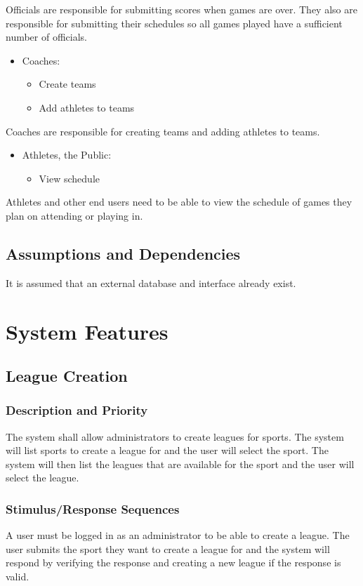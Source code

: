 \documentclass{scrreprt}
\begin{document}
Officials are responsible for submitting scores when games are over. They also are responsible for submitting their schedules so all games played have a sufficient number of officials.
\begin{itemize}
    \item Coaches:
    \begin{itemize}
        \item Create teams
        \item Add athletes to teams
    \end{itemize}
\end{itemize}
Coaches are responsible for creating teams and adding athletes to teams.
\begin{itemize}
    \item Athletes, the Public:
    \begin{itemize}
        \item View schedule
    \end{itemize}
\end{itemize}
Athletes and other end users need to be able to view the schedule of games they plan on attending or playing in.

\section{Assumptions and Dependencies}

It is assumed that an external database and interface already exist.

\chapter{System Features}

\section{League Creation}

\subsection{Description and Priority}
The system shall allow administrators to create leagues for sports. The system will list sports to create a league for and the user will select the sport. The system will then list the leagues that are available for the sport and the user will select the league.

\subsection{Stimulus/Response Sequences}
A user must be logged in as an administrator to be able to create a league. The user submits the sport they want to create a league for and the system will respond by verifying the response and creating a new league if the response is valid.
\end{document}
